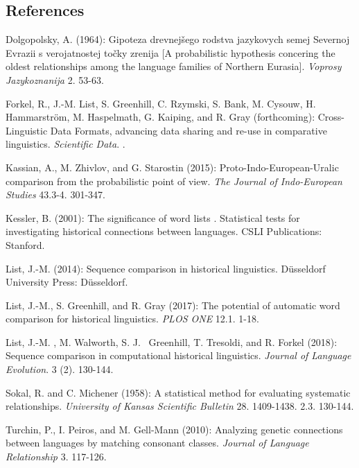 \documentclass[
  a4paper,
  14pt,
  oneside,
  tablecaptionabove
]{scrbook}
\begin{document}
\subsection*{References}

\nopagebreak\hangindent=0.7cm {\small Dolgopolsky, A. (1964): {Gipoteza drevnejšego rodstva
jazykovych semej Severnoj Evrazii s verojatnostej točky zrenija} {[}A
probabilistic hypothesis concering the oldest relationships among the
language families of Northern Eurasia{]}. \emph{Voprosy Jazykoznanija}
2. 53-63.}

\nopagebreak\hangindent=0.7cm {\small Forkel, R., J.-M. List, S. Greenhill, C. Rzymski, S. Bank, M. Cysouw,
H. Hammarström, M. Haspelmath, G. Kaiping, and R. Gray (forthcoming):
{Cross-Linguistic Data Formats, advancing data sharing and re-use
in comparative linguistics}.  \emph{Scientific Data}. . }

\nopagebreak\hangindent=0.7cm {\small Kassian, A., M. Zhivlov, and G. Starostin (2015):
{Proto-Indo-European-Uralic comparison from the probabilistic
point of view}.  \emph{The Journal of Indo-European Studies} 43.3-4.
301-347. }

\nopagebreak\hangindent=0.7cm {\small Kessler, B. (2001): {The significance of word lists} {.
Statistical tests for investigating historical connections between
languages}.  CSLI Publications: Stanford. }

\nopagebreak\hangindent=0.7cm {\small List, J.-M. (2014): {Sequence comparison in historical
linguistics}.  Düsseldorf University Press: Düsseldorf. }

\nopagebreak\hangindent=0.7cm {\small List, J.-M., S. Greenhill, and R. Gray (2017): {The potential
of automatic word comparison for historical linguistics}.  \emph{PLOS
ONE} 12.1. 1-18. }

\nopagebreak\hangindent=0.7cm {\small List, J.-M. , M. Walworth, S. J.~ Greenhill, T. Tresoldi, and R.
Forkel (2018): {Sequence comparison in computational historical
linguistics}.  \emph{Journal of Language Evolution}. 3 (2). 130-144.\\ }

\nopagebreak\hangindent=0.7cm {\small Sokal, R. and C. Michener (1958): {A statistical method for
evaluating systematic relationships}.  \emph{University of Kansas
Scientific Bulletin} 28. 1409-1438. 2.3. 130-144.\\ }

\nopagebreak\hangindent=0.7cm {\small Turchin, P., I. Peiros, and M. Gell-Mann (2010): {Analyzing
genetic connections between languages by matching consonant classes}. 
\emph{Journal of Language Relationship} 3. 117-126. }
\end{document}
